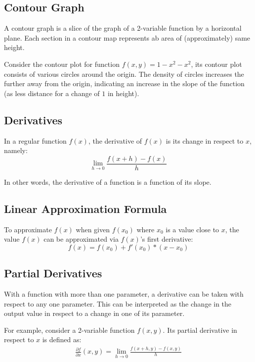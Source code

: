\documentclass[12pt]{article}
\theoremstyle{definition}
\begin{document}
	\subsection{Contour Graph}
	
	A contour graph is a slice of the graph of a 2-variable function by a horizontal plane. Each section in a contour map represents ab area of (approximately) same height.
	
	Consider the contour plot for function $f(x, y) = 1 - x^2 - x^2$, its contour plot consists of various circles around the origin. The density of circles increases the further away from the origin, indicating an increase in the slope of the function (as less distance for a change of $1$ in height).
	
	\subsection{Derivatives}
	
	In a regular function $f(x)$, the derivative of $f(x)$ is its change in respect to $x$, namely:
	\begin{equation*}
		\lim_{h \to 0} \frac{f(x + h) - f(x)}{h}
	\end{equation*}
	
	In other words, the derivative of a function is a function of its slope.
	
	\subsection{Linear Approximation Formula}
	
	To approximate $f(x)$ when given $f(x_0)$ where $x_0$ is a value close to $x$, the value $f(x)$ can be approximated via $f(x)$'s first derivative:
	\begin{equation*}
		f(x) = f(x_0) + f'(x_0) * (x - x_0)
	\end{equation*}
	
	\subsection{Partial Derivatives}
	
	With a function with more than one parameter, a derivative can be taken with respect to any one parameter. This can be interpreted as the change in the output value in respect to a change in one of its parameter.
	
	For example, consider a 2-variable function $f(x, y)$. Its partial derivative in respect to $x$ is defined as:
	\begin{gather*}
		\frac{\partial f}{\partial x}(x, y) = \lim_{h \to 0} \frac{f(x + h, y) - f(x, y)}{h}
	\end{gather*}
	
\end{document}
